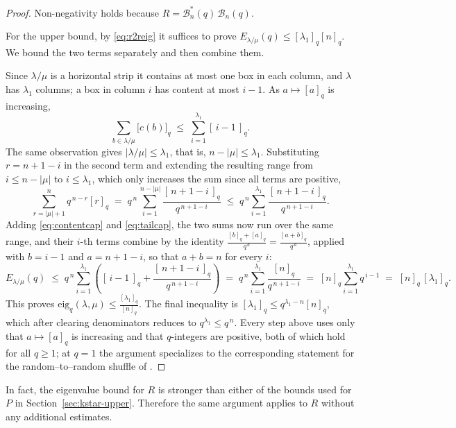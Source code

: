 \documentclass[11pt]{article}
\theoremstyle{plain}  %
\newcommand{\eig}{\text{eig}} %
\begin{document}
\begin{proof}
Non-negativity holds because $R = \mathcal{B}^{*}_n(q)\,\mathcal{B}_n(q)$.

For the upper bound, by \eqref{eq:r2reig} it suffices to prove $E_{\lambda/\mu}(q) \le [\lambda_1]_q[n]_q$. We bound
the two terms separately and then combine them.

Since $\lambda/\mu$ is a horizontal strip it contains at most one box in each
column, and $\lambda$ has $\lambda_1$ columns; a box in column $i$ has content
at most $i-1$. As $a \mapsto [a]_q$ is increasing,
\begin{equation}\label{eq:contentcap}
  \sum_{b\in\lambda/\mu}\bigl[c(b)\bigr]_q
  \;\le\; \sum_{i=1}^{\lambda_1}[\,i-1\,]_q .
\end{equation}
The same observation gives $|\lambda/\mu| \le \lambda_1$, that is,
$n - |\mu| \le \lambda_1$. Substituting $r = n+1-i$ in the second term and
extending the resulting range from $i \le n-|\mu|$ to $i \le \lambda_1$, which
only increases the sum since all terms are positive,
\begin{equation}\label{eq:tailcap}
  \sum_{r=|\mu|+1}^{n} q^{\,n-r}[r]_q
  \;=\; q^{\,n}\sum_{i=1}^{\,n-|\mu|}\frac{[\,n+1-i\,]_q}{q^{\,n+1-i}}
  \;\le\; q^{\,n}\sum_{i=1}^{\lambda_1}\frac{[\,n+1-i\,]_q}{q^{\,n+1-i}} .
\end{equation}
Adding \eqref{eq:contentcap} and \eqref{eq:tailcap}, the two sums now run over
the same range, and their $i$-th terms combine by the identity
$\frac{[b]_q + [a]_q}{q^{\,a}} = \frac{[a+b]_q}{q^{\,a}}$, applied with $b = i-1$ and
$a = n+1-i$, so that $a+b = n$ for every $i$:
$$
  E_{\lambda/\mu}(q)
  \;\le\; q^{\,n}\sum_{i=1}^{\lambda_1}
          \left([\,i-1\,]_q + \frac{[\,n+1-i\,]_q}{q^{\,n+1-i}}\right)
  \;=\; q^{\,n}\sum_{i=1}^{\lambda_1}\frac{[n]_q}{q^{\,n+1-i}}
  \;=\; [n]_q\sum_{i=1}^{\lambda_1} q^{\,i-1}
  \;=\; [n]_q\,[\lambda_1]_q .
$$
This proves $\eig_q(\lambda,\mu) \le \frac{[\lambda_1]_q}{[n]_q}$. The final
inequality is $[\lambda_1]_q \le q^{\lambda_1-n}[n]_q$, which after clearing
denominators reduces to $q^{\lambda_1} \le q^{\,n}$. Every step above uses
only that $a \mapsto [a]_q$ is increasing and that $q$-integers are positive,
both of which hold for all $q \ge 1$; at $q = 1$ the argument specializes to
the corresponding statement for the random--to--random shuffle of
\cite{Dieker2018}.
\end{proof}

  In fact, the eigenvalue bound for $R$ is stronger than either of the bounds used for $P$ in
Section~\ref{sec:kstar-upper}. Therefore the same argument applies to $R$ without any
additional estimates.
\end{document}
